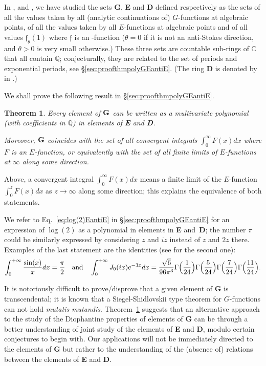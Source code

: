 \documentclass[reqno,12pt]{article}
\numberwithin{equation}{section}
\newtheorem{theo}{Theorem}
\theoremstyle{remark}
\newcommand{\Qbar}{\overline{\mathbb Q}}
\newcommand{\tantie}{{\fontencoding{OT2}\fontfamily{wncyr}\selectfont\CYREREV}}
\newcommand{\antie}{\text{\tantie}}
\newcommand{\fgo}{\mathfrak{f}}
\begin{document}
In \cite{gvalues}, \cite{ateo} and \cite[\S 4.3]{fuchsien}, we have studied the sets {\bf G},  {\bf E} and {\bf D} defined respectively as the sets of all the values taken  by all (analytic continuations of) $G$-functions at algebraic points, of  all the values taken by all  $E$-functions at algebraic points and  of all values 
$\fgo_\theta(1)$ where $\fgo$ is an  \antie-function ($\theta=0$ if it is not an anti-Stokes direction, and $\theta>0$ is very small otherwise.) These three sets are countable sub-rings of $\mathbb C$ that all contain $\Qbar$; conjecturally, they are related to the set of periods and exponential periods, see \S\ref{sec:proofthmpolyGEantiE}. (The ring {\bf D} is denoted by {\bf \tantie} in \cite{fuchsien}.)

We shall prove the following result in \S\ref{sec:proofthmpolyGEantiE}.


\begin{theo}\label{theo:GpolyEantiE} Every element of ${\bf G}$ can be written as a multivariate polynomial (with coefficients in $\Qbar$)  in elements of 
{\bf E} and {\bf D}.

Moreover, ${\bf G}$ coincides with the set of all convergent integrals $\int_0^{\infty }F(x)dx$ where $F$ is an $E$-function, or equivalently with the set of all finite limits of $E$-functions at $\infty$ along some direction.
\end{theo}

Above, a convergent integral $\int_0^{\infty}F(x)dx$ means a finite limit of the $E$-function $\int_0^zF(x)dx$ as $z\to \infty$ along some direction; this explains the equivalence of both statements.


We refer to  Eq.~\eqref{eq:log(2)EantiE} in \S\ref{sec:proofthmpolyGEantiE} for an expression of $\log(2)$ as a polynomial in elements in {\bf E} and~{\bf D}; the number $\pi$ could be similarly expressed by considering $z$ and $iz$ instead of $z$ and $2z$ there.  
Examples of the last statement are the identities (see \cite{zucker} for the second one):
$$
\int_0^{+\infty} \frac{\sin(x)}x dx=\frac{\pi}{2} \quad \textup{and} \quad \int_0^{+\infty}J_0(ix)e^{-3x}dx=\frac{\sqrt{6}}{96\pi^3}
\Gamma\Big(\frac{1}{24}\Big)\Gamma\Big(\frac{5}{24}\Big)\Gamma\Big(\frac{7}{24}\Big)\Gamma\Big(\frac{11}{24}\Big).
$$ 



It is notoriously difficult to prove/disprove that a given element of {\bf G} is transcendental; it is known that a Siegel-Shidlovskii type theorem for $G$-functions can not hold {\em mutatis mutandis}. Theorem~\ref{theo:GpolyEantiE} suggests that an alternative approach to the study of the Diophantine properties of elements of {\bf G} can be through a better understanding of joint study of the elements of {\bf E} and {\bf D}, modulo certain conjectures to begin with. Our applications will not be immediately directed to the elements of {\bf G} but rather to the understanding of the (absence of) relations between the elements of {\bf E} and {\bf D}.
\end{document}
